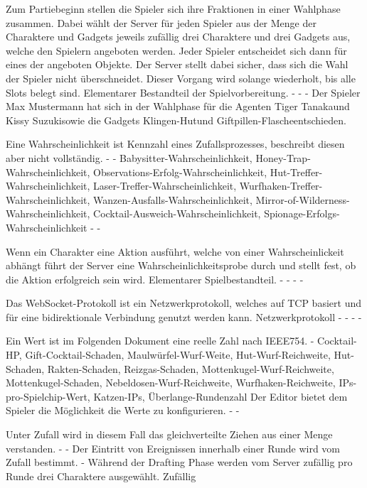 {Zum Partiebeginn stellen die Spieler sich ihre Fraktionen in einer Wahlphase zusammen. Dabei wählt der Server für jeden Spieler aus der Menge der Charaktere und Gadgets jeweils zufällig drei Charaktere und drei Gadgets aus, welche den Spielern angeboten werden. Jeder Spieler entscheidet sich dann für eines der angeboten Objekte. Der Server stellt dabei sicher, dass sich die Wahl der Spieler nicht überschneidet. Dieser Vorgang wird solange wiederholt, bis alle Slots belegt sind.}
{Elementarer Bestandteil der Spielvorbereitung.}
{-}
{-}
{-}
{Der Spieler \glqq Max Mustermann \grqq hat sich in der Wahlphase für die Agenten \glqq Tiger Tanaka\grqq und \glqq Kissy Suzuki\grqq sowie die Gadgets \glqq Klingen-Hut\grqq und \glqq Giftpillen-Flasche\grqq  entschieden.}

{Eine Wahrscheinlichkeit ist Kennzahl eines Zufallsprozesses, beschreibt diesen aber nicht vollständig.}
{-}
{-}
{Babysitter-Wahrscheinlichkeit, Honey-Trap-Wahrscheinlichkeit, Observations-Erfolg-Wahrscheinlichkeit, Hut-Treffer-Wahrscheinlichkeit, Laser-Treffer-Wahrscheinlichkeit, Wurfhaken-Treffer-Wahrscheinlichkeit, Wanzen-Ausfalls-Wahrscheinlichkeit, Mirror-of-Wilderness-Wahrscheinlichkeit, Cocktail-Ausweich-Wahrscheinlichkeit, Spionage-Erfolgs-Wahrscheinlichkeit}
{-}
{-}

{Wenn ein Charakter eine Aktion ausführt, welche von einer Wahrscheinlickeit abhängt führt der Server eine Wahrscheinlichkeitsprobe durch und stellt fest, ob die Aktion erfolgreich sein wird.}
{Elementarer Spielbestandteil.}
{-}
{-}
{-}
{-}

{Das WebSocket-Protokoll ist ein Netzwerkprotokoll, welches auf TCP basiert und für eine bidirektionale Verbindung genutzt werden kann.}
{Netzwerkprotokoll}
{-}
{-}
{-}
{-}

{Ein Wert ist im Folgenden Dokument eine reelle Zahl nach IEEE754.}
{-}
{Cocktail-HP, Gift-Cocktail-Schaden, Maulwürfel-Wurf-Weite, Hut-Wurf-Reichweite, Hut-Schaden, Rakten-Schaden, Reizgas-Schaden, Mottenkugel-Wurf-Reichweite, Mottenkugel-Schaden, Nebeldosen-Wurf-Reichweite, Wurfhaken-Reichweite, IPs-pro-Spielchip-Wert, Katzen-IPs, Überlange-Rundenzahl}
{Der Editor bietet dem Spieler die Möglichkeit die Werte zu konfigurieren.}
{-}
{-}

{Unter Zufall wird in diesem Fall das gleichverteilte Ziehen aus einer Menge verstanden.}
{-}
{-}
{Der Eintritt von Ereignissen innerhalb einer Runde wird vom Zufall bestimmt.}
{-}
{Während der Drafting Phase werden vom Server zufällig pro Runde drei Charaktere ausgewählt.}
{Zufällig}

